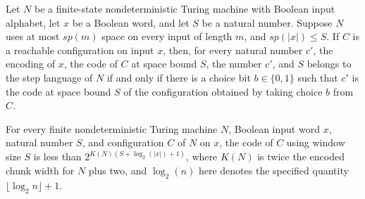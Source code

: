 \begin{theorem}
\label{Randomized.PolyAmp.mem_stepLang_iff}
\leanok
{}
Let $N$ be a finite-state nondeterministic Turing machine with Boolean input alphabet,
let $x$ be a Boolean word, and let $S$ be a natural number. Suppose $N$ uses at most
$sp(m)$ space on every input of length $m$, and $sp(\lvert x\rvert)\le S$. If $C$ is a
reachable configuration on input $x$, then, for every natural number $c'$, the encoding
of $x$, the code of $C$ at space bound $S$, the number $c'$, and $S$ belongs to the step
language of $N$ if and only if there is a choice bit $b\in\{0,1\}$ such that $c'$ is the
code at space bound $S$ of the configuration obtained by taking choice $b$ from $C$.
\end{theorem}

\begin{theorem}
\label{Randomized.PolyAmp.cfgCode_lt_codeBound}
\leanok
{}
For every finite nondeterministic Turing machine $N$, Boolean input word $x$, natural
number $S$, and configuration $C$ of $N$ on $x$, the code of $C$ using window size $S$
is less than $2^{K(N)(S+\log_2(|x|)+1)}$, where $K(N)$ is twice the encoded chunk width
for $N$ plus two, and $\log_2(n)$ here denotes the specified quantity $\lfloor\log_2
n\rfloor+1$.
\end{theorem}
